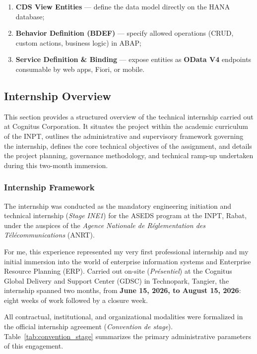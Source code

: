 \begin{enumerate}
    \item \textbf{CDS View Entities} --- define the data model directly on the HANA database;
    \item \textbf{Behavior Definition (BDEF)} --- specify allowed operations (CRUD, custom actions, business logic) in ABAP;
    \item \textbf{Service Definition \& Binding} --- expose entities as \textbf{OData V4} endpoints consumable by web apps, Fiori, or mobile.
\end{enumerate}

\subsection{Internship Overview}
\label{subsec:internship_overview}

This section provides a structured overview of the technical internship carried out at Cognitus Corporation. It situates the project within the academic curriculum of the INPT, outlines the administrative and supervisory framework governing the internship, defines the core technical objectives of the assignment, and details the project planning, governance methodology, and technical ramp-up undertaken during this two-month immersion.

\subsubsection{Internship Framework}
\label{subsubsec:internship_framework}

The internship was conducted as the mandatory engineering initiation and technical internship (\textit{Stage INE1}) for the ASEDS program at the INPT, Rabat, under the auspices of the \textit{Agence Nationale de R\'eglementation des T\'el\'ecommunications} (ANRT). 

For me, this experience represented my very first professional internship and my initial immersion into the world of enterprise information systems and Enterprise Resource Planning (ERP). Carried out on-site (\textit{Pr\'esentiel}) at the Cognitus Global Delivery and Support Center (GDSC) in Technopark, Tangier, the internship spanned two months, from \textbf{June 15, 2026, to August 15, 2026}: eight weeks of work followed by a closure week.

All contractual, institutional, and organizational modalities were formalized in the official internship agreement (\textit{Convention de stage}). Table~\ref{tab:convention_stage} summarizes the primary administrative parameters of this engagement.

